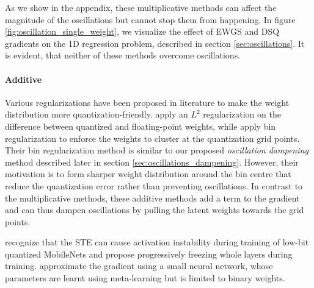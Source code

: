 As we show in the appendix, these multiplicative methods can affect the magnitude of the oscillations but cannot stop them from happening. In figure \ref{fig:oscillation_single_weight}, we visualize the effect of EWGS and DSQ gradients on the 1D regression problem, described in section \ref{sec:oscillations}. It is evident, that neither of these methods overcome oscillations.
\vspace{-.1cm}
\paragraph{Additive} Various regularizations have been proposed in literature to make the weight distribution more quantization-friendly.
\citet{qat_tinyml} apply an $L^2$ regularization on the difference between quantized and floating-point weights, while \citet{binreg} apply bin regularization to enforce the weights to cluster at the quantization grid points. Their bin regularization method is similar to our proposed \textit{oscillation dampening} method described later in section \ref{sec:oscillations_dampening}. However, their motivation is to form sharper weight distribution around the bin centre that reduce the quantization error rather than preventing oscillations. In contrast to the multiplicative methods, these additive methods add a term to the gradient and can thus dampen oscillations by pulling the latent weights towards the grid points.


\citet{profit} recognize that the STE can cause activation instability during training of low-bit quantized MobileNets and propose progressively freezing whole layers during training. \citet{metaquant} approximate the gradient using a small neural network, whose parameters are learnt using meta-learning but is limited to binary weights.
